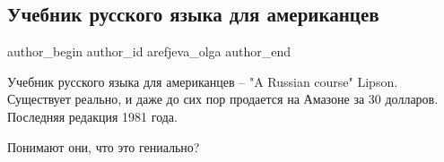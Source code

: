  
 
 
 
 
 
\subsection{Учебник русского языка для американцев}
\label{sec:18_11_2021.fb.arefjeva_olga.1.uchebnik_jazyk}
 
\ifcmt
 author_begin
   author_id arefjeva_olga
 author_end
\fi

Учебник русского языка для американцев – "A Russian course" Lipson. Существует
реально, и даже до сих пор продается на Амазоне за 30 долларов. Последняя
редакция 1981 года.


Понимают они, что это гениально?

